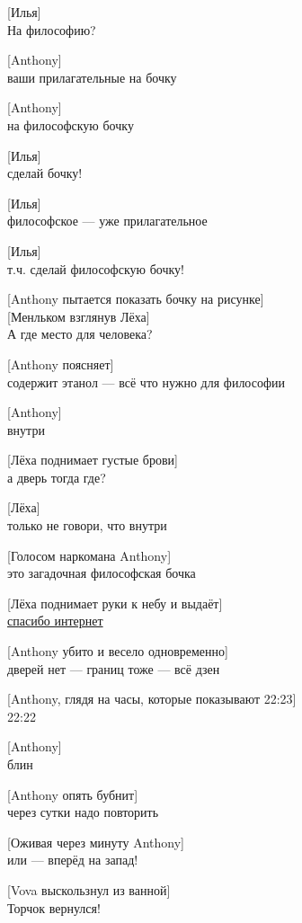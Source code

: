 [Илья]\\
На философию?


[Anthony]\\
ваши прилагательные на бочку


[Anthony]\\
на философскую бочку


[Илья]\\
сделай бочку!


[Илья]\\
философское — уже прилагательное


[Илья]\\
т.ч. сделай философскую бочку!


[Anthony пытается показать бочку на рисунке]\\
[\href{https://thumbs.dreamstime.com/thumb_850/8505013.jpg}{Рисунок}]


[Менльком взглянув Лёха]\\
А где место для человека?


[Anthony поясняет]\\
содержит этанол --- всё что нужно для философии


[Anthony]\\
внутри


[Лёха поднимает густые брови]\\
а дверь тогда где?


[Лёха]\\
только не говори, что внутри


[Голосом наркомана Anthony]\\
это загадочная философская бочка


[Лёха поднимает руки к небу и выдаёт]\\
\href{http://sad.co.ua/wp-content/uploads/2014/07/dveri-bochka.png}{спасибо интернет}


[Anthony убито и весело одновременно]\\
дверей нет --- границ тоже --- всё дзен


[Anthony, глядя на часы, которые показывают 22:23]\\
22:22


[Anthony]\\
блин


[Anthony опять бубнит]\\
через сутки надо повторить


[Оживая через минуту Anthony]\\
или --- вперёд на запад!


[Vova выскользнул из ванной]\\
Торчок вернулся!


